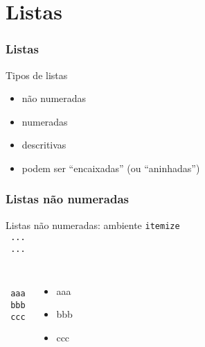 
\section{Listas}

\begin{frame}
  \frametitle{Listas}
  \begin{block}{Tipos de listas}
    \begin{itemize}
    \item não numeradas
    \item numeradas
    \item descritivas
    \item podem ser ``encaixadas'' (ou ``aninhadas'')
    \end{itemize}
  \end{block}

\end{frame}

\begin{frame}
  \frametitle{Listas não numeradas}
  \begin{block}{Listas não numeradas: ambiente \texttt{itemize}}
    \texttt{\\
        \purple{\string\item}\ ...\\
        \purple{\string\item}\ ...\\
        }
  \end{block}


  \begin{exemplo}

    \begin{columns}[c]
      \column{4cm}
      \texttt{\\
          \purple{\string\item}\ aaa\\
          \purple{\string\item}\ bbb\\
          \purple{\string\item}\ ccc\\
          }
      \column{3cm}
      \begin{itemize}
      \item aaa
      \item bbb
      \item ccc
      \end{itemize}
    \end{columns}

  \end{exemplo}


\end{frame}


